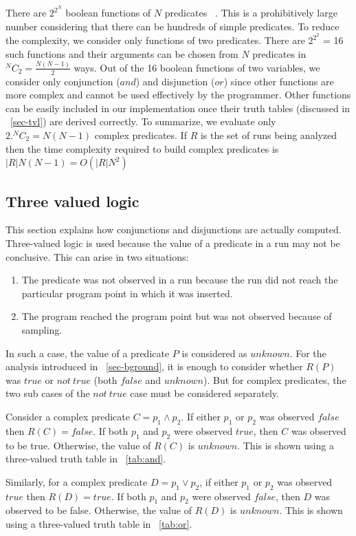 There are $2^{2^N}$ boolean functions of $N$ predicates ~\cite{MathWorld:BoolFuncs}.  This is a prohibitively large number considering that there can be hundreds of simple predicates.  To reduce the complexity, we consider only functions of two predicates.  There are $2^{2^2}$ = 16 such functions and their arguments can be chosen from $N$ predicates in $^NC_2 = \frac{N(N-1)}{2}$ ways.  Out of the 16 boolean functions of two variables, we consider only conjunction ($and$) and disjunction ($or$) since other functions are more complex and cannot be used effectively by the programmer.  Other functions can be easily included in our implementation once their truth tables (discussed in ~\autoref{sec-tvl}) are derived correctly.  To summarize, we evaluate only $2. ^NC_2 = N(N-1)$ complex predicates.  If $R$ is the set of runs being analyzed then the time complexity required to build complex predicates is $|R|N(N-1) = O(|R|N^2)$

\subsection{Three valued logic}
\label{sec-tvl}
This section explains how conjunctions and disjunctions are actually computed.  Three-valued logic is used because the value of a predicate in a run may not be conclusive. This can arise in two situations:
\begin{enumerate}
\item The predicate was not observed in a run because the run did not reach the particular program point in which it was inserted.
\item The program reached the program point but was not observed because of sampling.
\end{enumerate}

In such a case, the value of a predicate $P$ is considered as $unknown$.  For the analysis introduced in ~\ref{sec-bground}, it is enough to consider whether $R(P)$ was $true$ or $not\ true$ (both $false$ and $unknown$).  But for complex predicates, the two sub cases of the $not\ true$ case must be considered separately.

Consider a complex predicate $C = p_1 \wedge p_2$.  If either $p_1$ or $p_2$ was observed $false$ then $R(C) = false$.  If both $p_1$ and $p_2$ were observed $true$, then $C$ was observed to be true.  Otherwise, the value of $R(C)$ is $unknown$.  This is shown using a three-valued truth table in ~\autoref{tab:and}.

Similarly, for a complex predicate $D = p_1 \vee p_2$, if either $p_1$ or $p_2$ was observed $true$ then $R(D) = true$.  If both $p_1$ and $p_2$ were observed $false$, then $D$ was observed to be false.  Otherwise, the value of $R(D)$ is $unknown$.  This is shown using a three-valued truth table in ~\autoref{tab:or}.
 
